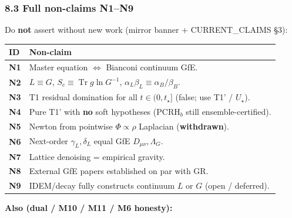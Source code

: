 \documentclass[
  11pt,
]{article}
\newcounter{none} %
\begin{document}
\subsubsection{8.3 Full non-claims N1--N9}\label{full-non-claims-n1n9}

Do \textbf{not} assert without new work (mirror banner + CURRENT\_CLAIMS
§3):

{\def\LTcaptype{none} %
\begin{longtable}[]{@{}
  >{\raggedright\arraybackslash}p{}
  >{\raggedright\arraybackslash}p{}@{}}
\toprule\noalign{}
\begin{minipage}[b]{\linewidth}\raggedright
ID
\end{minipage} & \begin{minipage}[b]{\linewidth}\raggedright
Non-claim
\end{minipage} \\
\midrule\noalign{}
\endhead
\bottomrule\noalign{}
\endlastfoot
\textbf{N1} & Master equation \(\Leftrightarrow\) Bianconi continuum
GfE. \\
\textbf{N2} & \(L \equiv G\),
\(S_c \equiv \operatorname{Tr} g\ln G^{-1}\),
\(\alpha_L\beta_L \equiv \alpha_B/\beta_B\). \\
\textbf{N3} & T1 residual domination for all \(t\in(0,t_\star]\) (false;
use T1' / \(U_\star\)). \\
\textbf{N4} & Pure T1' with \textbf{no} soft hypotheses (PCRH\(_b\)
still ensemble-certified). \\
\textbf{N5} & Newton from pointwise \(\Phi\propto\rho\) Laplacian
(\textbf{withdrawn}). \\
\textbf{N6} & Next-order \(\gamma_L,\delta_L\) equal GfE
\(D_{\mu\nu},\Lambda_G\). \\
\textbf{N7} & Lattice denoising = empirical gravity. \\
\textbf{N8} & External GfE papers established on par with GR. \\
\textbf{N9} & IDEM/decay fully constructs continuum \(L\) or \(G\) (open
/ deferred). \\
\end{longtable}
}

\textbf{Also (dual / M10 / M11 / M6 honesty):}
\end{document}
